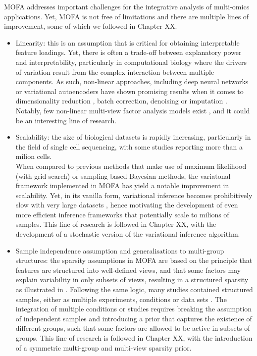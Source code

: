 MOFA addresses important challenges for the integrative analysis of multi-omics applications. Yet, MOFA is not free of limitations and there are multiple lines of improvement, some of which we followed in Chapter XX.\\
\begin{itemize}

	\item Linearity: this is an assumption that is critical for obtaining interpretable feature loadings. Yet, there is often a trade-off between explanatory power and interpretability, particularly in computational biology where the drivers of variation result from the complex interaction between multiple components. As such, non-linear approaches, including deep neural networks or variational autoencoders have shown promising results when it comes to dimensionality reduction \cite{XX}, batch correction\cite{XX}, denoising \cite{XX} or imputation \cite{XX}. Notably, few non-linear multi-view factor analysis models exist \cite{Damianou2016}, and it could be an interesting line of research.

	\item Scalability: the size of biological datasets is rapidly increasing, particularly in the field of single cell sequencing, with some studies reporting more than a milion cells\cite{Svensson2018,Cao2019}. \\
	When compared to previous methods that make use of maximum likelihood (with grid-search) or sampling-based Bayesian methods,  the variatonal framework implemented in MOFA has yield a notable improvement in scalability. Yet, in its vanilla form, variational inference becomes prohibitively slow with very large datasets \cite{XX}, hence motivating the development of even more efficient inference frameworks that potentially scale to milions of samples. This line of research is followed in Chapter XX, with the development of a stochastic version of the variational inference algorithm.

	\item Sample independence assumption and generalisations to multi-group structures: the sparsity assumptions in MOFA are based on the principle that features are structured into well-defined views, and that some factors may explain variability in only subsets of views, resulting in a structured sparsity as illustrated in . Following the same logic, many studies contained structured samples, either as multiple experiments, conditions or data sets \cite{XX}. The integration of multiple conditions or studies requires breaking the assumption of independent samples and introducing a prior that captures the existence of different groups, such that some factors are allowed to be active in subsets of groups. This line of research is followed in Chapter XX, with the introduction of a symmetric multi-group and multi-view sparsity prior.


\end{itemize}
